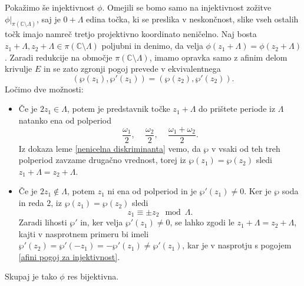 \documentclass[mat1]{fmfdelo}
\numberwithin{equation}{section}
\newcommand{\C}{\mathbb C}
\newcommand{\om}{\omega}
\theoremstyle{definition}
\begin{document}
\begin{dokaz}
    Pokažimo še injektivnost $\phi$. Omejili se bomo samo na injektivnost zožitve $\phi|_{\pi(\C\setminus\Lambda)}$, saj je $0 + \Lambda$ edina točka, ki se preslika v neskončnost, slike vseh ostalih točk imajo namreč tretjo projektivno koordinato neničelno. Naj bosta $z_1 + \Lambda, z_2 + \Lambda \in \pi(\C \setminus \Lambda)$ poljubni in denimo, da velja $\phi(z_1 + \Lambda) = \phi(z_2 + \Lambda)$. Zaradi redukcije na območje $\pi(\C \setminus \Lambda)$, imamo opravka samo z afinim delom krivulje $E$ in se zato zgronji pogoj prevede v ekvivalentnega 
    \begin{equation}
        \label{afini pogoj za injektivnost}
        (\wp(z_1), \wp'(z_1)) = (\wp(z_2), \wp'(z_2)). 
    \end{equation}  
    Ločimo dve možnosti:
    \begin{itemize}
        \item
        Če je $2z_1 \in \Lambda$, potem je predstavnik točke $z_1 + \Lambda$ do prištete periode iz $\Lambda$ natanko ena od polperiod
        \[
            \frac{\om_1}{2}\text{, } \quad \frac{\om_2}{2}\text{, } \quad \frac{\om_1 + \om_2}{2}.
        \]
        Iz dokaza leme \ref{nenicelna diskriminanta} vemo, da $\wp$ v vsaki od teh treh polperiod zavzame drugačno vrednost, torej iz $\wp(z_1) = \wp(z_2)$ sledi $z_1 + \Lambda = z_2 + \Lambda$.

        \item 
        Če je $2z_1 \not\in \Lambda$, potem $z_1$ ni ena od polperiod in je $\wp'(z_1) \neq 0$. Ker je $\wp$ soda in reda $2$, iz $\wp(z_1) = \wp(z_2)$ sledi
        \[
            z_1  \equiv \pm z_2 \mod{\Lambda}. 
        \]
        Zaradi lihosti $\wp'$ in, ker velja $\wp'(z_1) \neq 0$, se lahko zgodi le $z_1 + \Lambda = z_2 + \Lambda$, kajti v nasprotnem primeru bi imeli $\wp'(z_2) = \wp'(-z_1) = -\wp'(z_1) \neq \wp'(z_1)$, kar je v nasprotju s pogojem \ref{afini pogoj za injektivnost}.
    \end{itemize}
    Skupaj je tako $\phi$ res bijektivna. 


\end{dokaz}
\end{document}
